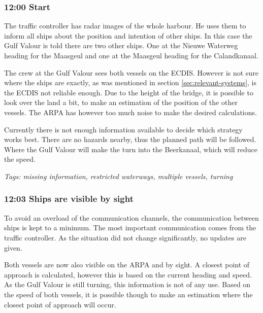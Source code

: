 \subsubsection{12:00 Start}
The traffic controller has radar images of the whole harbour. He uses them to inform all ships about the position and intention of other ships. In this case the Gulf Valour is told there are two other ships. One at the Nieuwe Waterweg heading for the Maasgeul and one at the Maasgeul heading for the Calandkanaal.

The crew at the Gulf Valour sees both vessels on the \ac{ECDIS}. However is not sure where the ships are exactly, as was mentioned in section \ref{sec:relevant-systems}, is the \ac{ECDIS} not reliable enough. Due to the height of the bridge, it is possible to look over the land a bit, to make an estimation of the position of the other vessels. The \ac{ARPA} has however too much noise to make the desired calculations. 

Currently there is not enough information available to decide which strategy works best. There are no hazards nearby, thus the planned path will be followed. Where the Gulf Valour will make the turn into the Beerkanaal, which will reduce the speed.

\emph{Tags: missing information, restricted waterways, multiple vessels, turning}

\subsubsection{12:03 Ships are visible by sight}
To avoid an overload of the communication channels, the communication between ships is kept to a minimum. The most important communication comes from the traffic controller. As the situation did not change significantly, no updates are given.

Both vessels are now also visible on the \ac{ARPA} and by sight. A closest point of approach is calculated, however this is based on the current heading and speed. As the Gulf Valour is still turning, this information is not of any use. Based on the speed of both vessels, it is possible though to make an estimation where the closest point of approach will occur. 

